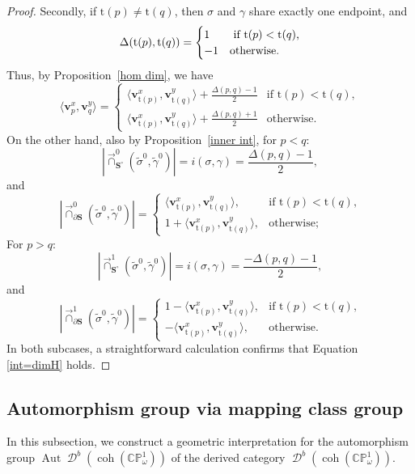 \documentclass[11pt,a4paper,reqno]{amsart}%
\theoremstyle{plain}
\theoremstyle{definition}
\numberwithin{equation}{section}
\numberwithin{equation}{section}
\def\<{\langle}
\def\>{\rangle}
\newcommand{\D}{\operatorname{\mathcal{D}}}
\def\surf{\mathbf{S}} %
\def\surfi{\surf^\circ}
\def\wt{\omega}
\newcommand{\bv}{\mathbf{v}}
\def\coh{\operatorname{coh}}
\def\Aut{\operatorname{Aut}}
\newcommand{\typ}[1]{\mathrm{t}(#1)}%
\def\surf{\mathbf{S}}                       %
\def\coh{\operatorname{coh}}
\def\CPone{\mathbb{CP}^1_{\wt}}
\newcommand\DC[1]{\D^b(\coh(#1))}
\begin{document}
\begin{proof}
 
  Secondly, if $\typ{p}\ne\typ{q}$,  then $\sigma$ and $\gamma$ share exactly one endpoint, and  
\[
\Delta(\typ{p} ,\typ{q})=\begin{cases}
    1 & \text{ if $\typ{p}<\typ{q}$%
    ,}\\
    -1 & \text{otherwise.}
\end{cases}
\]
Thus,  by Proposition~\ref{hom dim}, we have
  \[
 \<\bv_p^x,\bv_q^y\>=\begin{cases} 
\<\bv_{\typ{p}}^x, \bv_{\typ{q}}^y\> +\frac{\Delta(p,q)-1}{2}   & \text{if  $\typ{p}<\typ{q}$},\\ 
 \<\bv_{\typ{p}}^x, \bv_{\typ{q}}^y\> + \frac{\Delta(p,q)+1}{2}   & \text{otherwise.}
\end{cases}
\]
On the other hand, also by Proposition~\ref{inner int},
for $p<q$:
\[|\overrightarrow{\cap}^0_{\surfi}(\widetilde{\sigma}^0 ,\widetilde{\gamma}^0 )|=i ({\sigma},{\gamma} )=\frac{\Delta(p,q)-1}{2},
\]
and
\[
|\overrightarrow{\cap}^0_{\partial\surf}(\widetilde{\sigma}^0 ,\widetilde{\gamma}^0 )|=\begin{cases}
    \<\bv_{\typ{p}}^x, \bv_{\typ{q}}^y\>, & \text{if  $\typ{p}<\typ{q}$,} \\
    1+ \<\bv_{\typ{p}}^x, \bv_{\typ{q}}^y\>, & \text{otherwise;}
 \end{cases}\]
For  $p>q$:
\[|\overrightarrow{\cap}^1_{\surfi}(\widetilde{\sigma}^0 ,\widetilde{\gamma}^0 )|= i({\sigma} ,{\gamma} )=\frac{-\Delta(p,q)-1}{2},
\]
and
\[
|\overrightarrow{\cap}^1_{\partial\surf}(\widetilde{\sigma}^0 ,\widetilde{\gamma}^0 )|=\begin{cases}
    1-\<\bv_{\typ{p}}^x, \bv_{\typ{q}}^y\>, & \text{if  $\typ{p}<\typ{q}$,} \\
    -\<\bv_{\typ{p}}^x, \bv_{\typ{q}}^y\>, & \text{otherwise.}
 \end{cases}\]
In both subcases, a straightforward calculation confirms that Equation \eqref{int=dimH} holds.
 \end{proof}
  
\subsection{Automorphism group via mapping class group}\label{sec:aut=mcg}
 In this subsection,  we construct a geometric interpretation for the automorphism group
  $\Aut\DC{\CPone} $ of the derived category $\DC{\CPone}$.
 
\end{document}
